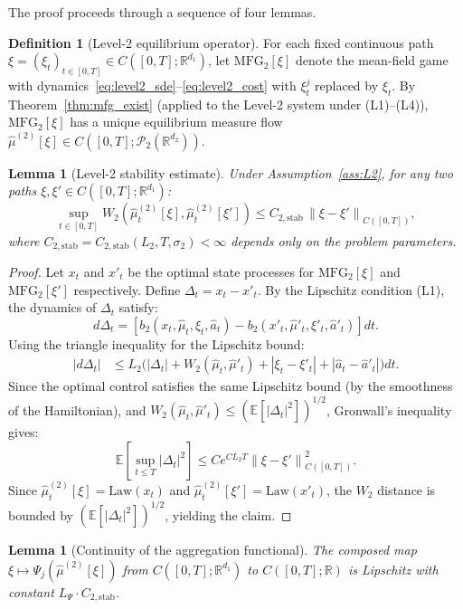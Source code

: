 \documentclass[12pt,a4paper]{article}
\theoremstyle{plain}
\newtheorem{lemma}[theorem]{Lemma}
\theoremstyle{definition}
\newtheorem{definition}[theorem]{Definition}
\newcommand{\R}{\mathbb{R}}
\newcommand{\E}{\mathbb{E}}
\newcommand{\Prob}{\mathcal{P}}
\newcommand{\Law}{\mathrm{Law}}
\newcommand{\1}{\mathbbm{1}}
\newcommand{\norm}[1]{\left\|#1\right\|}
\newcommand{\WD}[2]{W_2(#1,#2)}  %
\begin{document}
The proof proceeds through a sequence of four lemmas.

\begin{definition}[Level-2 equilibrium operator]
\label{def:lvl2_eq}
For each fixed continuous path $\xi = (\xi_t)_{t\in[0,T]} \in
C([0,T];\R^{d_1})$, let $\mathrm{MFG}_2[\xi]$ denote the mean-field game
with dynamics~\eqref{eq:level2_sde}--\eqref{eq:level2_cost} with $\xi^j_t$
replaced by $\xi_t$.  By Theorem~\ref{thm:mfg_exist} (applied to the
Level-2 system under (L1)--(L4)), $\mathrm{MFG}_2[\xi]$ has a unique
equilibrium measure flow $\hat{\mu}^{(2)}[\xi] \in C([0,T];\Prob_2(\R^{d_2}))$.
\end{definition}

\begin{lemma}[Level-2 stability estimate]
\label{lem:L2_stability}
Under Assumption~\ref{ass:L2}, for any two paths
$\xi, \xi' \in C([0,T];\R^{d_1})$:
\[
\sup_{t\in[0,T]} \WD{\hat{\mu}^{(2)}_t[\xi]}{\hat{\mu}^{(2)}_t[\xi']}
\leq C_{2,\mathrm{stab}}\,\norm{\xi - \xi'}_{C([0,T])},
\]
where $C_{2,\mathrm{stab}} = C_{2,\mathrm{stab}}(L_2, T, \sigma_2) < \infty$
depends only on the problem parameters.
\end{lemma}

\begin{proof}
Let $x_t$ and $x'_t$ be the optimal state processes for $\mathrm{MFG}_2[\xi]$
and $\mathrm{MFG}_2[\xi']$ respectively.  Define $\Delta_t = x_t - x'_t$.
By the Lipschitz condition (L1), the dynamics of $\Delta_t$ satisfy:
\[
d\Delta_t = \left[b_2(x_t, \hat\mu_t, \xi_t, \hat a_t)
                 - b_2(x'_t, \hat\mu'_t, \xi'_t, \hat a'_t)\right]dt.
\]
Using the triangle inequality for the Lipschitz bound:
\begin{align*}
|d\Delta_t| &\leq L_2\bigl(|\Delta_t| + \WD{\hat\mu_t}{\hat\mu'_t}
                           + |\xi_t - \xi'_t| + |\hat a_t - \hat a'_t|\bigr)dt.
\end{align*}
Since the optimal control satisfies the same Lipschitz bound (by the
smoothness of the Hamiltonian), and $\WD{\hat\mu_t}{\hat\mu'_t}
\leq (\E[|\Delta_t|^2])^{1/2}$, Gronwall's inequality gives:
\[
\E\!\left[\sup_{t\leq T}|\Delta_t|^2\right]
\leq C e^{C L_2 T}\norm{\xi - \xi'}_{C([0,T])}^2.
\]
Since $\hat\mu^{(2)}_t[\xi] = \Law(x_t)$ and $\hat\mu^{(2)}_t[\xi'] = \Law(x'_t)$,
the $W_2$ distance is bounded by $(\E[|\Delta_t|^2])^{1/2}$, yielding the claim.
\end{proof}

\begin{lemma}[Continuity of the aggregation functional]
\label{lem:agg_cont}
The composed map
$\xi \mapsto \Psi_j(\hat\mu^{(2)}[\xi])$
from $C([0,T];\R^{d_1})$ to $C([0,T];\R)$ is Lipschitz with constant
$L_\Psi \cdot C_{2,\mathrm{stab}}$.
\end{lemma}
\end{document}
